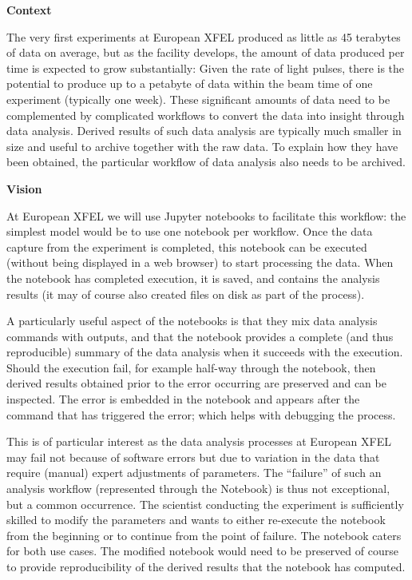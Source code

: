 \begin{task}[
  title=Reproducible photon science workflows at European XFEL,
  id=reproducibility-xfel,
  lead=XFEL,
  PM=36,
  wphases={7-48},
  partners={INSERM,SRL,UPSUD}
  ]
  \medskip
  \textbf{Context}

  The very first experiments at European XFEL
  produced as little as 45 terabytes of data on average, but as the
  facility develops, the amount of data produced per time is expected
  to grow substantially: Given the rate of light pulses, there is the
  potential to produce up to a petabyte of data within the beam time
  of one experiment (typically one week). These significant amounts of
  data need to be complemented by complicated workflows to convert the
  data into insight through data analysis. Derived results of such
  data analysis are typically much smaller in size and useful to
  archive together with the raw data. To explain how they have been
  obtained, the particular workflow of data analysis also needs to be
  archived.

  \medskip
  \textbf{Vision}

  At European XFEL we will use Jupyter notebooks to facilitate
  this workflow: the simplest model would be to use one notebook per
  workflow. Once the data capture from the experiment is completed,
  this notebook can be executed (without being displayed in a web
  browser) to start processing the data. When the notebook has
  completed execution, it is saved, and contains the analysis results
  (it may of course also created files on disk as part of the
  process).

  A particularly useful aspect of the notebooks is that they mix data
  analysis commands with outputs, and that the notebook provides a
  complete (and thus reproducible) summary of the data analysis when
  it succeeds with the execution. Should the execution fail, for
  example half-way through the notebook, then derived results obtained
  prior to the error occurring are preserved and can be inspected. The
  error is embedded in the notebook and appears after the command that
  has triggered the error; which helps with debugging the process.

  This is of particular interest as the data analysis processes at
  European XFEL may fail not because of software errors but due to
  variation in the data that require (manual) expert adjustments of
  parameters. The ``failure'' of such an analysis workflow
  (represented through the Notebook) is thus not exceptional, but a
  common occurrence. The scientist conducting the experiment is
  sufficiently skilled to modify the parameters and wants to either
  re-execute the notebook from the beginning or to continue from the
  point of failure. The notebook caters for both use cases. The
  modified notebook would need to be preserved of course to provide
  reproducibility of the derived results that the notebook has
  computed.


\end{task}
